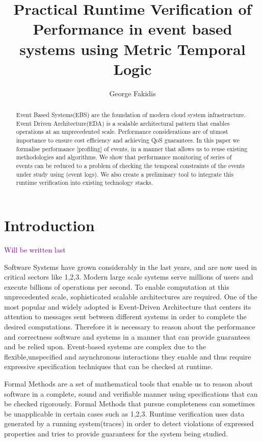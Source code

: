 \documentclass{article}
\title{Practical Runtime Verification of Performance in event based systems using Metric Temporal Logic}
\author{George Fakidis}
\newcommand{\note}[1] {
	\textcolor{Purple}{#1}

}
\begin{document}
\maketitle
\begin{abstract}
	Event Based Systems(EBS) are the foundation of modern cloud system infrastructure. Event Driven Architecture(EDA) is a scalable architectural pattern that enables operations at an unprecedented scale. Performance considerations are of utmost importance to ensure cost efficiency and achieving QoS guarantees. In this paper we formalise performance [profiling] of events, in a manner that allows us to reuse existing methodologies and algorithms. We show that performance monitoring of series of events can be reduced to a problem of checking the temporal constraints of the events under study using (event logs). We also create a preliminary tool to integrate this runtime verification into existing technology stacks.
\end{abstract}


\section{Introduction}

\note{Will be written last}

Software Systems have grown considerably in the last years, and are now used in critical sectors like 1,2,3.
Modern large scale systems serve millions of users and execute billions of operations per second.
To enable computation at this unprecedented scale, sophisticated scalable architectures are required.
One of the most popular and widely adopted is Event-Driven Architecture that centers its attention to messages sent between different systems in order to complete the desired computations.
Therefore it is necessary to reason about the performance and correctness software and systems in a manner that can provide guarantees and be relied upon. Event-based systems are complex due to the flexible,unspecified and asynchronous interactions they enable and thus require expressive specification techniques that can be checked at runtime.
\par
[This will be written from Wikipedia and mb a couple foundational papers] Formal Methods are a set of mathematical tools that enable us to reason about software in a complete, sound and verifiable manner using specifications that can be checked rigorously. Formal Methods that pursue completeness can sometimes be unapplicable in certain cases such as 1,2,3. Runtime verification uses data generated by a running system(traces) in order to detect violations of expressed properties and tries to provide guarantees for the system being studied.
\end{document}
